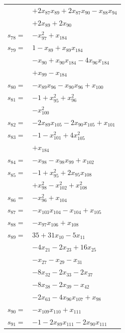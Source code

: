 \begin{longtable}{@{}r@{\;}l@{}}
 & \(\displaystyle +2x_{87}x_{89} +2x_{87}x_{90} -x_{88}x_{94}\) \\
 & \(\displaystyle +2x_{89} +2x_{90}\) \\[3pt]
\(s_{78}=\) & \(\displaystyle -x_{97}^{2} +x_{184}\) \\[3pt]
\(s_{79}=\) & \(\displaystyle 1 -x_{89} +x_{89}x_{184}\) \\
 & \(\displaystyle -x_{90} +x_{90}x_{184} -4x_{96}x_{184}\) \\
 & \(\displaystyle +x_{99} -x_{184}\) \\[3pt]
\(s_{80}=\) & \(\displaystyle -x_{89}x_{96} -x_{90}x_{96} +x_{100}\) \\[3pt]
\(s_{81}=\) & \(\displaystyle -1 +x_{95}^{2} +x_{96}^{2}\) \\
 & \(\displaystyle -x_{100}^{2}\) \\[3pt]
\(s_{82}=\) & \(\displaystyle -2x_{89}x_{105} -2x_{90}x_{105} +x_{101}\) \\[3pt]
\(s_{83}=\) & \(\displaystyle -1 -x_{101}^{2} +4x_{105}^{2}\) \\
 & \(\displaystyle +x_{184}\) \\[3pt]
\(s_{84}=\) & \(\displaystyle -x_{98} -x_{98}x_{99} +x_{102}\) \\[3pt]
\(s_{85}=\) & \(\displaystyle -1 +x_{95}^{2} +2x_{95}x_{108}\) \\
 & \(\displaystyle +x_{98}^{2} -x_{102}^{2} +x_{108}^{2}\) \\[3pt]
\(s_{86}=\) & \(\displaystyle -x_{96}^{2} +x_{104}\) \\[3pt]
\(s_{87}=\) & \(\displaystyle -x_{103}x_{104} -x_{104} +x_{105}\) \\[3pt]
\(s_{88}=\) & \(\displaystyle -x_{97}x_{106} +x_{108}\) \\[3pt]
\(s_{89}=\) & \(\displaystyle 35 +31x_{10} -5x_{11}\) \\
 & \(\displaystyle -4x_{21} -2x_{23} +16x_{25}\) \\
 & \(\displaystyle -x_{27} -x_{29} -x_{31}\) \\
 & \(\displaystyle -8x_{32} -2x_{33} -2x_{37}\) \\
 & \(\displaystyle -8x_{38} -2x_{39} -x_{42}\) \\
 & \(\displaystyle -2x_{63} -4x_{96}x_{107} +x_{98}\) \\[3pt]
\(s_{90}=\) & \(\displaystyle -x_{109}x_{110} +x_{111}\) \\[3pt]
\(s_{91}=\) & \(\displaystyle -1 -2x_{89}x_{111} -2x_{90}x_{111}\) \\

\end{longtable}
